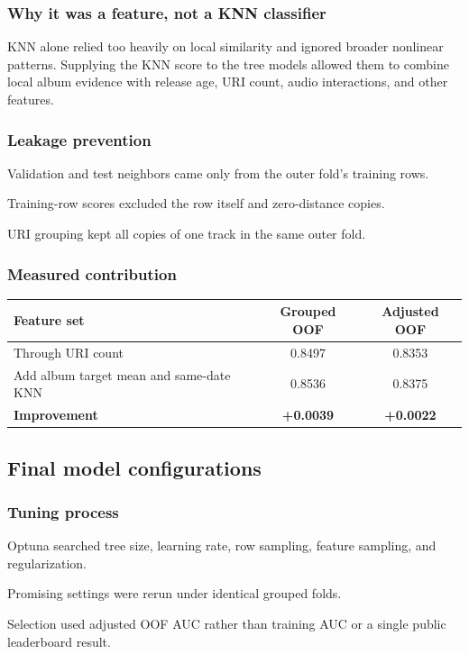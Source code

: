 \documentclass{article}
\begin{document}
\subsubsection{Why it was a feature, not a KNN classifier}
KNN alone relied too heavily on local similarity and ignored broader
nonlinear patterns. Supplying the KNN score to the tree models allowed them to
combine local album evidence with release age, URI count, audio interactions,
and other features.

\subsubsection{Leakage prevention}
\begin{compactitem}
  \item Validation and test neighbors came only from the outer fold's training
  rows.
  \item Training-row scores excluded the row itself and zero-distance copies.
  \item URI grouping kept all copies of one track in the same outer fold.
\end{compactitem}

\subsubsection{Measured contribution}
\begin{center}
\footnotesize
\setlength{\tabcolsep}{7pt}
\renewcommand{\arraystretch}{1.08}
\begin{tabular}{@{}lcc@{}}
\toprule
\textbf{Feature set} & \textbf{Grouped OOF} & \textbf{Adjusted OOF} \\
\midrule
Through URI count & 0.8497 & 0.8353 \\
Add album target mean and same-date KNN & 0.8536 & 0.8375 \\
\textbf{Improvement} & \textbf{+0.0039} & \textbf{+0.0022} \\
\bottomrule
\end{tabular}
\end{center}

\subsection{Final model configurations}
\label{app:configs}
\subsubsection{Tuning process}
\begin{compactitem}
  \item Optuna searched tree size, learning rate, row sampling, feature
  sampling, and regularization.
  \item Promising settings were rerun under identical grouped folds.
  \item Selection used adjusted OOF AUC rather than training AUC or a single
  public leaderboard result.
\end{compactitem}
\end{document}
